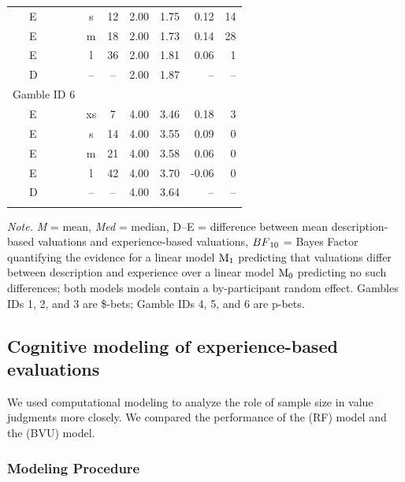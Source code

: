 \documentclass[a4paper, man, floatsintext]{apa6}
\begin{document}
\begin{table}[tbp]
\begin{center}
\begin{threeparttable}
\begin{tabular}{lccccrr}
\ \ \ E & s & 12 & 2.00 & 1.75 & 0.12 & 14\\
\ \ \ E & m & 18 & 2.00 & 1.73 & 0.14 & 28\\
\ \ \ E & l & 36 & 2.00 & 1.81 & 0.06 & 1\\
\ \ \ D & -- & -- & 2.00 & 1.87 & -- & --\\
Gamble ID 6 &  &  &  &  &  & \\
\ \ \ E & xs & 7 & 4.00 & 3.46 & 0.18 & 3\\
\ \ \ E & s & 14 & 4.00 & 3.55 & 0.09 & 0\\
\ \ \ E & m & 21 & 4.00 & 3.58 & 0.06 & 0\\
\ \ \ E & l & 42 & 4.00 & 3.70 & -0.06 & 0\\
\ \ \ D & -- & -- & 4.00 & 3.64 & -- & --\\
\bottomrule
\addlinespace
\end{tabular}
\begin{tablenotes}[para]
\normalsize{\textit{Note.} \textit{M} = mean, \textit{Med} = median, D--E = difference between mean description-based valuations and experience-based valuations, $BF\textsubscript{10}$ = Bayes Factor quantifying the evidence for a linear model $\mathrm{M}\textsubscript{1}$ predicting that valuations differ between description and experience over a linear model $\mathrm{M}\textsubscript{0}$ predicting no such differences; both models models contain a by-participant random effect. Gambles IDs 1, 2, and 3 are \$-bets; Gamble IDs 4, 5, and 6 are p-bets.}
\end{tablenotes}
\end{threeparttable}
\end{center}
\end{table}

\subsection{Cognitive modeling of experience-based evaluations}

We used computational modeling to analyze the role of sample size in
value judgments more closely. We compared the performance of the
 (RF) model and the
 (BVU) model.

\subsubsection{Modeling Procedure}
\end{document}
